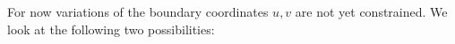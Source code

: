 \documentclass[12pt,a4paper,utf8]{article}
\begin{document}
	
%	
	
	For now variations of the boundary coordinates $u,v$ are not yet constrained. We look at the following two possibilities:
	
\end{document}
